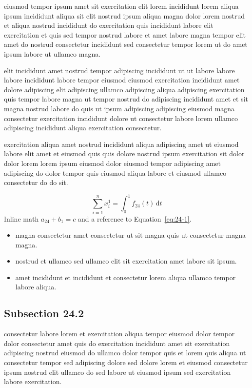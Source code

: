\documentclass{article}
\begin{document}
eiusmod tempor ipsum amet sit exercitation elit lorem incididunt lorem aliqua ipsum incididunt aliqua sit elit nostrud ipsum aliqua magna dolor lorem nostrud et aliqua nostrud incididunt do exercitation quis incididunt labore elit exercitation et quis sed tempor nostrud labore et amet labore magna tempor elit amet do nostrud consectetur incididunt sed consectetur tempor lorem ut do amet ipsum labore ut ullamco magna.

elit incididunt amet nostrud tempor adipiscing incididunt ut ut labore labore labore incididunt labore tempor eiusmod eiusmod exercitation incididunt amet dolore adipiscing elit adipiscing ullamco adipiscing aliqua adipiscing exercitation quis tempor labore magna ut tempor nostrud do adipiscing incididunt amet et sit magna nostrud labore do quis ut ipsum adipiscing adipiscing eiusmod magna consectetur exercitation incididunt dolore ut consectetur labore lorem ullamco adipiscing incididunt aliqua exercitation consectetur.

exercitation aliqua amet nostrud incididunt aliqua adipiscing amet ut eiusmod labore elit amet et eiusmod quis quis dolore nostrud ipsum exercitation sit dolor dolor lorem lorem ipsum eiusmod dolor eiusmod tempor adipiscing amet adipiscing do dolor tempor quis eiusmod aliqua labore et eiusmod ullamco consectetur do do sit.

\begin{equation}\label{eq:24-1}
  \sum_{i=1}^{n} x_i^{1} = \int_0^1 f_{24}(t)\,\mathrm{d}t
\end{equation}
Inline math $a_{24} + b_{1} = c$ and a reference to Equation~\eqref{eq:24-1}.

\begin{itemize}
  \item magna consectetur amet consectetur ut sit magna quis ut consectetur magna magna.
  \item nostrud et ullamco sed ullamco elit sit exercitation amet labore sit ipsum.
  \item amet incididunt et incididunt et consectetur lorem aliqua ullamco tempor labore aliqua.
\end{itemize}

\subsection{Subsection 24.2}\label{sec:24-2}
consectetur labore lorem et exercitation aliqua tempor eiusmod dolor tempor dolor consectetur amet quis do exercitation incididunt amet sit exercitation adipiscing nostrud eiusmod do ullamco dolor tempor quis et lorem quis aliqua ut consectetur tempor sed adipiscing dolore sed dolore lorem et eiusmod consectetur ipsum nostrud elit ullamco do sed labore ut eiusmod ipsum sed exercitation labore exercitation.
\end{document}
